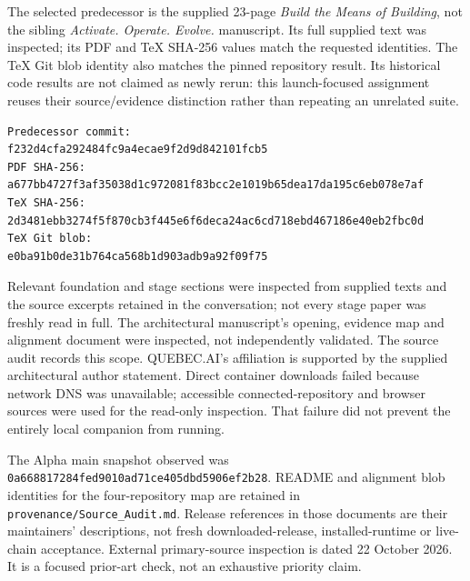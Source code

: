 \documentclass[11pt,letterpaper]{article}
\begin{document}
The selected predecessor is the supplied 23-page \emph{Build the Means of Building}, not the sibling \emph{Activate. Operate. Evolve.} manuscript. Its full supplied text was inspected; its PDF and TeX SHA-256 values match the requested identities. The TeX Git blob identity also matches the pinned repository result. Its historical code results are not claimed as newly rerun: this launch-focused assignment reuses their source/evidence distinction rather than repeating an unrelated suite.

\begin{lstlisting}
Predecessor commit:
f232d4cfa292484fc9a4ecae9f2d9d842101fcb5
PDF SHA-256:
a677bb4727f3af35038d1c972081f83bcc2e1019b65dea17da195c6eb078e7af
TeX SHA-256:
2d3481ebb3274f5f870cb3f445e6f6deca24ac6cd718ebd467186e40eb2fbc0d
TeX Git blob:
e0ba91b0de31b764ca568b1d903adb9a92f09f75
\end{lstlisting}

Relevant foundation and stage sections were inspected from supplied texts and the source excerpts retained in the conversation; not every stage paper was freshly read in full. The architectural manuscript's opening, evidence map and alignment document were inspected, not independently validated. The source audit records this scope. QUEBEC.AI's affiliation is supported by the supplied architectural author statement. Direct container downloads failed because network DNS was unavailable; accessible connected-repository and browser sources were used for the read-only inspection. That failure did not prevent the entirely local companion from running.

The Alpha main snapshot observed was \nolinkurl{0a668817284fed9010ad71ce405dbd5906ef2b28}. README and alignment blob identities for the four-repository map are retained in \texttt{provenance/Source\_Audit.md}. Release references in those documents are their maintainers' descriptions, not fresh downloaded-release, installed-runtime or live-chain acceptance. External primary-source inspection is dated 22 October 2026. It is a focused prior-art check, not an exhaustive priority claim.
\end{document}
